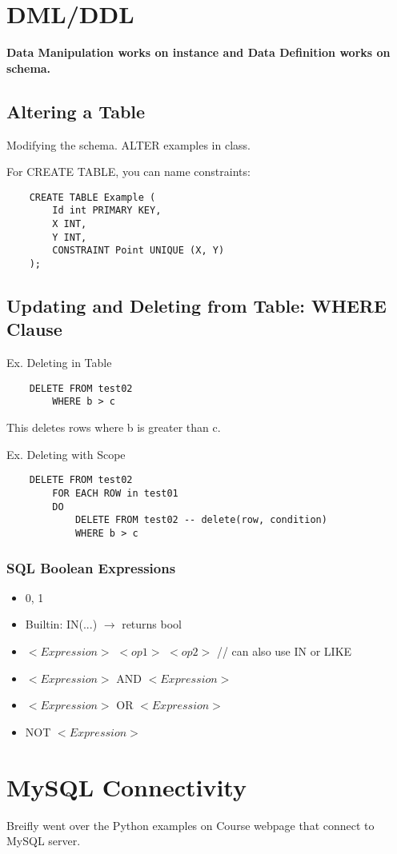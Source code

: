 \documentclass[twoside]{article}
\begin{document}
\section*{DML/DDL}

\textbf{Data Manipulation works on instance and Data Definition works on schema.}

\subsection*{Altering a Table}
Modifying the schema. ALTER examples in class.

For CREATE TABLE, you can name constraints: 
\begin{verbatim}
    CREATE TABLE Example (
        Id int PRIMARY KEY,
        X INT,
        Y INT,
        CONSTRAINT Point UNIQUE (X, Y)
    );
\end{verbatim}

\subsection*{Updating and Deleting from Table: WHERE Clause}

Ex. Deleting in Table
\begin{verbatim}
    DELETE FROM test02
        WHERE b > c
\end{verbatim}
This deletes rows where b is greater than c.

Ex. Deleting with Scope
\begin{verbatim}
    DELETE FROM test02
        FOR EACH ROW in test01
        DO 
            DELETE FROM test02 -- delete(row, condition)
            WHERE b > c
\end{verbatim}

\subsubsection*{SQL Boolean Expressions}
\begin{itemize}
    \item 0, 1
    \item Builtin: IN(...) $\longrightarrow$ returns bool
    \item $<Expression>$ $<op1>$ $<op2>$ // can also use IN or LIKE
    \item $<Expression>$ AND $<Expression>$
    \item $<Expression>$ OR $<Expression>$
    \item NOT $<Expression>$
\end{itemize}


\section*{MySQL Connectivity}
Breifly went over the Python examples on Course webpage that connect to 
MySQL server.
\end{document}

